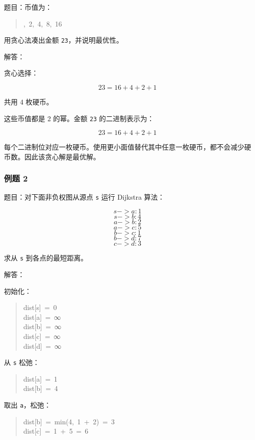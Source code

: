 \documentclass[UTF8,zihao=-4]{ctexart}
\begin{document}
题目：币值为：

\begin{quote}
\small\ttfamily\raggedright
{},\ 2,\ 4,\ 8,\ 16\\
\end{quote}

用贪心法凑出金额 \texttt{23}，并说明最优性。

解答：

贪心选择：

\[23 = 16 + 4 + 2 + 1\]

共用 4 枚硬币。

这些币值都是 2 的幂。金额 \texttt{23} 的二进制表示为：

\[23 = 16 + 4 + 2 + 1\]

每个二进制位对应一枚硬币。使用更小面值替代其中任意一枚硬币，都不会减少硬币数。因此该贪心解是最优解。

\subsubsection*{例题 2}

题目：对下面非负权图从源点 \texttt{s} 运行 Dijkstra 算法：

\[s->a: 1\]
\[s->b: 4\]
\[a->b: 2\]
\[a->c: 5\]
\[b->c: 1\]
\[b->d: 7\]
\[c->d: 3\]

求从 \texttt{s} 到各点的最短距离。

解答：

初始化：

\begin{quote}
\small\ttfamily\raggedright
\relax dist[s]\ =\ 0\\
\relax dist[a]\ =\ ∞\\
\relax dist[b]\ =\ ∞\\
\relax dist[c]\ =\ ∞\\
\relax dist[d]\ =\ ∞\\
\end{quote}

从 \texttt{s} 松弛：

\begin{quote}
\small\ttfamily\raggedright
\relax dist[a]\ =\ 1\\
\relax dist[b]\ =\ 4\\
\end{quote}

取出 \texttt{a}，松弛：

\begin{quote}
\small\ttfamily\raggedright
\relax dist[b]\ =\ min(4,\ 1\ +\ 2)\ =\ 3\\
\relax dist[c]\ =\ 1\ +\ 5\ =\ 6\\
\end{quote}
\end{document}
